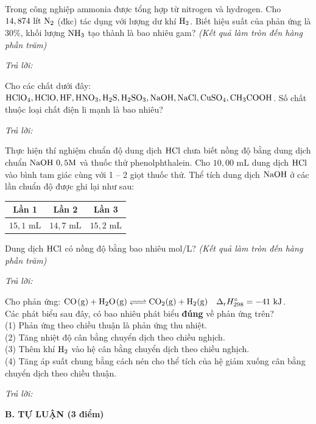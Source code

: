 \documentclass[11pt,a4paper]{article}
\begin{document}
\begin{ex}
Trong công nghiệp ammonia được tổng hợp từ nitrogen và hydrogen. Cho $14,874\text{ lít }\ce{N2}$ (đkc) tác dụng với lượng dư khí $\ce{H2}$. Biết hiệu suất của phản ứng là $30\%$, khối lượng $\ce{NH3}$ tạo thành là bao nhiêu gam? \textit{(Kết quả làm tròn đến hàng phần trăm)}

\noindent\textit{Trả lời:} \dotfill
\end{ex}
\begin{ex}
Cho các chất dưới đây: $\ce{HClO4}, \ce{HClO}, \ce{HF}, \ce{HNO3}, \ce{H2S}, \ce{H2SO3}, \ce{NaOH}, \ce{NaCl}, \ce{CuSO4}, \ce{CH3COOH}$. Số chất thuộc loại chất điện li mạnh là bao nhiêu?

\noindent\textit{Trả lời:} \dotfill
\end{ex}
\begin{ex}
Thực hiện thí nghiệm chuẩn độ dung dịch $\ce{HCl}$ chưa biết nồng độ bằng dung dịch chuẩn $\ce{NaOH}\ 0,5\text{M}$ và thuốc thử phenolphthalein. Cho $10,00\text{ mL}$ dung dịch $\ce{HCl}$ vào bình tam giác cùng với 1 -- 2 giọt thuốc thử. Thể tích dung dịch $\ce{NaOH}$ ở các lần chuẩn độ được ghi lại như sau:
\begin{center}
\renewcommand{\arraystretch}{1.2}
\begin{tabular}{|c|c|c|}
\hline
\rowcolor{tableGreen}
\textbf{Lần 1} & \textbf{Lần 2} & \textbf{Lần 3} \\
\hline
$15,1\text{ mL}$ & $14,7\text{ mL}$ & $15,2\text{ mL}$ \\
\hline
\end{tabular}
\end{center}
Dung dịch $\ce{HCl}$ có nồng độ bằng bao nhiêu mol/L? \textit{(Kết quả làm tròn đến hàng phần trăm)}

\noindent\textit{Trả lời:} \dotfill
\end{ex}
\begin{ex}
Cho phản ứng: $\ce{CO(g) + H2O(g) <=> CO2(g) + H2(g)}\quad \Delta_{\mathrm{r}}H^{\circ}_{298} = -41\text{ kJ}$.\\
Các phát biểu sau đây, có bao nhiêu phát biểu \textbf{đúng} về phản ứng trên?\\
(1) Phản ứng theo chiều thuận là phản ứng thu nhiệt.\\
(2) Tăng nhiệt độ cân bằng chuyển dịch theo chiều nghịch.\\
(3) Thêm khí $\ce{H2}$ vào hệ cân bằng chuyển dịch theo chiều nghịch.\\
(4) Tăng áp suất chung bằng cách nén cho thể tích của hệ giảm xuống cân bằng chuyển dịch theo chiều thuận.

\noindent\textit{Trả lời:} \dotfill
\end{ex}
\vspace{6pt}
\noindent
{\color{mainGreen}\textbf{\Large B. TỰ LUẬN (3 điểm)}}
\vspace{2pt}
\end{document}
